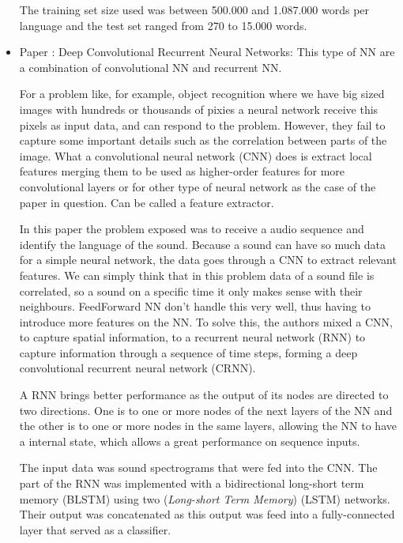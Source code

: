 \documentclass[journal, a4paper]{IEEEtran}
\begin{document}
\begin{itemize}
        The training set size used was between 500.000 and 1.087.000 words per language and the test set ranged from 270 to 15.000 words.
        \item Paper \cite{4}: Deep Convolutional Recurrent Neural Networks: 
    This type of NN are a combination of convolutional NN and recurrent NN.

    For a problem like, for example, object recognition where we have big sized images with hundreds 
or thousands of pixies a neural network receive this pixels as input data, and can respond to the 
problem. However, they fail to capture some important details such as the correlation between parts of 
the image. What a convolutional neural network (CNN) does is extract local features merging them to be 
used as higher-order features for more convolutional layers or for other type of neural network as the 
case of the paper in question. Can be called a feature extractor.

    In this paper the problem exposed was to receive a audio sequence and identify the language of the 
sound. Because a sound can have so much data for a simple neural network, the data goes through a 
CNN to extract relevant features.
    We can simply think that in this problem data of a sound file is correlated, so a sound on a 
specific time it only makes sense with their neighbours. FeedForward NN don't handle this very well, 
thus having to introduce more features on the NN. To solve this, the authors mixed a CNN, to capture 
spatial information, to a recurrent neural network (RNN) to capture information through a sequence 
of time steps, forming a deep convolutional recurrent neural network (CRNN).

    A RNN brings better performance as the output of its nodes are directed to two directions. One 
is to one or more nodes of the next layers of the NN and the other is to one or more nodes in the 
same layers, allowing the NN to have a internal state, which allows a great performance on sequence inputs.

      The input data was sound spectrograms that were fed into the CNN. The part of the RNN was 
implemented with a bidirectional long-short term memory (BLSTM) using two (\textit{Long-short 
Term Memory}) (LSTM) networks. Their output was concatenated as this output was feed into 
a fully-connected layer that served as a classifier.


\end{itemize}
\end{document}
